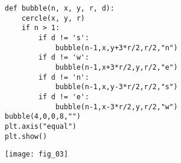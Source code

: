 \noindent\begin{minipage}[c]{.49\linewidth}
\begin{lstlisting}
def bubble(n, x, y, r, d):
    cercle(x, y, r)
    if n > 1:
        if d != 's':
            bubble(n-1,x,y+3*r/2,r/2,"n")
        if d != 'w':
            bubble(n-1,x+3*r/2,y,r/2,"e")
        if d != 'n':
            bubble(n-1,x,y-3*r/2,r/2,"s")
        if d != 'e':
            bubble(n-1,x-3*r/2,y,r/2,"w")
bubble(4,0,0,8,"")
plt.axis("equal")
plt.show()
\end{lstlisting}
\end{minipage} \hfill
\begin{minipage}[c]{.49\linewidth}
\begin{center}
\texttt{[image: fig\_03]}
\end{center}
\end{minipage}
%
%



